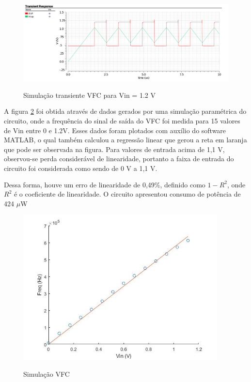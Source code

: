 \documentclass[
	12pt,				%
	oneside,			%
	a4paper,			%
	english,			%
	french,				%
	spanish,			%
	brazil				%
	]{abntex2}
\begin{document}
\begin{figure}[!ht]
  \centering
  \includegraphics[width=450pt]{saidaVFC12.png}\\
  \caption{Simulação transiente VFC para Vin = 1.2 V}\label{resVFC12}
\end{figure}

A figura \ref{resVFC} foi obtida através de dados gerados por uma simulação paramétrica do circuito, onde a frequência do sinal de saída do VFC foi medida para 15 valores de Vin entre 0 e 1.2V. Esses dados foram plotados com auxílio do software MATLAB, o qual também calculou a regressão linear que gerou a reta em laranja que pode ser observada na figura. Para valores de entrada acima de 1,1 V, observou-se perda considerável de linearidade, portanto a faixa de entrada do circuito foi considerada como sendo de 0 V a 1,1 V.

Dessa forma, houve um erro de linearidade de 0,49\%, definido como \(1-R^2\), onde $R^2$ é o coeficiente de linearidade. O circuito apresentou consumo de potência de 424 $\mu$W

\begin{figure}[!ht]
  \centering
  \includegraphics[width=300pt]{saidaVFC.jpg}\\
  \caption{Simulação VFC}\label{resVFC}
\end{figure}
\end{document}
